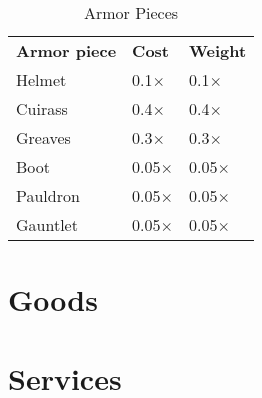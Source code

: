 \begin{table}[h]
    \unclassedrowcolors
    \begin{tabular}{l l l}
        \textbf{Armor piece} & \textbf{Cost} & \textbf{Weight} \\
        Helmet & 0.1$\times$ & 0.1$\times$ \\
        Cuirass & 0.4$\times$ & 0.4$\times$ \\
        Greaves & 0.3$\times$ & 0.3$\times$ \\
        Boot & 0.05$\times$ & 0.05$\times$ \\
        Pauldron & 0.05$\times$ & 0.05$\times$ \\
        Gauntlet & 0.05$\times$ & 0.05$\times$ \\
    \end{tabular}
    \caption{Armor Pieces}
    \label{tab:armor-pieces}
\end{table}

\section{Goods}

\section{Services}
